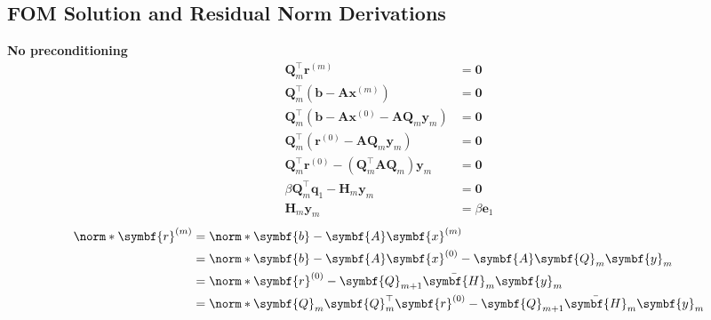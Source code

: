 \documentclass{article}
\begin{document}
\begin{multicols}{2}
    \section{FOM Solution and Residual Norm Derivations}
    \textbf{No preconditioning}
    \begin{align*}
        \symbf{Q}_m^\top \symbf{r}^{\left( m \right)}                                                                          & = \symbf{0}         \\
        \symbf{Q}_m^\top \left( \symbf{b} - \symbf{A} \symbf{x}^{\left( m \right)} \right)                                     & = \symbf{0}         \\
        \symbf{Q}_m^\top \left( \symbf{b} - \symbf{A} \symbf{x}^{\left( 0 \right)} - \symbf{A} \symbf{Q}_m \symbf{y}_m \right) & = \symbf{0}         \\
        \symbf{Q}_m^\top \left( \symbf{r}^{\left( 0 \right)} - \symbf{A} \symbf{Q}_m \symbf{y}_m \right)                       & = \symbf{0}         \\
        \symbf{Q}_m^\top \symbf{r}^{\left( 0 \right)} - \left( \symbf{Q}_m^\top \symbf{A} \symbf{Q}_m \right) \symbf{y}_m      & = \symbf{0}         \\
        \beta \symbf{Q}_m^\top \symbf{q}_1 - \symbf{H}_m \symbf{y}_m                                                           & = \symbf{0}         \\
        \symbf{H}_m \symbf{y}_m                                                                                                & = \beta \symbf{e}_1
    \end{align*}
    \begin{align*}
        \norm*{\symbf{r}^{\left( m \right)}} & = \norm*{\symbf{b} - \symbf{A} \symbf{x}^{\left( m \right)}}                                                                                                  \\
                                             & = \norm*{\symbf{b} - \symbf{A} \symbf{x}^{\left( 0 \right)} - \symbf{A} \symbf{Q}_m \symbf{y}_m}                                                              \\
                                             & = \norm*{\symbf{r}^{\left( 0 \right)} - \symbf{Q}_{m+1} \bar{\symbf{H}}_m \symbf{y}_m}                                                                        \\
                                             & = \norm*{\symbf{Q}_m \symbf{Q}_m^\top \symbf{r}^{\left( 0 \right)} - \symbf{Q}_{m+1} \bar{\symbf{H}}_m \symbf{y}_m}                                           \\

\end{align*}
\end{multicols}
\end{document}
